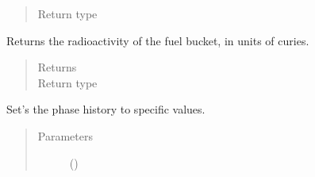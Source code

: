 \documentclass[letterpaper,10pt,openany,oneside,english]{sphinxmanual}
\begin{document}
\begin{fulllineitems}
\begin{fulllineitems}
\begin{quote}
\begin{description}
\item[{Return type}] \leavevmode
{}

\end{description}\end{quote}

\end{fulllineitems}


\begin{fulllineitems}
\label{\detokenize{support_rst/fuel_bucket:fuel_bucket.FuelBucket.radioactivity}}
Returns the radioactivity of the fuel bucket, in units of curies.
\begin{quote}\begin{description}
\item[{Returns}] \leavevmode
{}

\item[{Return type}] \leavevmode
{}

\end{description}\end{quote}

\end{fulllineitems}


\begin{fulllineitems}
\label{\detokenize{support_rst/fuel_bucket:fuel_bucket.FuelBucket.set_cladding_phase}}
Set’s the phase history to specific values.
\begin{quote}\begin{description}
\item[{Parameters}] \leavevmode
{} () \textendash{} 

\end{description}\end{quote}

\end{fulllineitems}



\end{fulllineitems}
\end{document}
